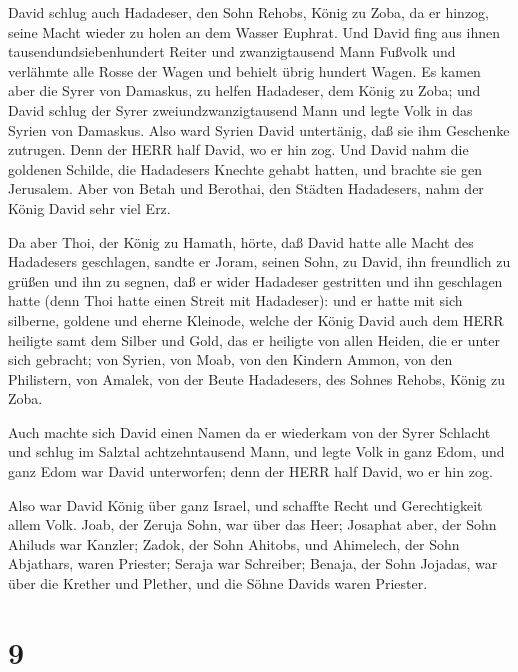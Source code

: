  David schlug auch Hadadeser, den Sohn Rehobs, König zu
Zoba, da er hinzog, seine Macht wieder zu holen an dem Wasser Euphrat.
 Und David fing aus ihnen tausendundsiebenhundert Reiter und
zwanzigtausend Mann Fußvolk und verlähmte alle Rosse der Wagen und
behielt übrig hundert Wagen.  Es kamen aber die Syrer von
Damaskus, zu helfen Hadadeser, dem König zu Zoba; und David schlug der
Syrer zweiundzwanzigtausend Mann  und legte Volk in das
Syrien von Damaskus. Also ward Syrien David untertänig, daß sie ihm
Geschenke zutrugen. Denn der HERR half David, wo er hin zog.
 Und David nahm die goldenen Schilde, die Hadadesers Knechte
gehabt hatten, und brachte sie gen Jerusalem.  Aber von
Betah und Berothai, den Städten Hadadesers, nahm der König David sehr
viel Erz.

 Da aber Thoi, der König zu Hamath, hörte, daß David hatte
alle Macht des Hadadesers geschlagen,  sandte er Joram,
seinen Sohn, zu David, ihn freundlich zu grüßen und ihn zu segnen, daß
er wider Hadadeser gestritten und ihn geschlagen hatte (denn Thoi hatte
einen Streit mit Hadadeser): und er hatte mit sich silberne, goldene und
eherne Kleinode,  welche der König David auch dem HERR
heiligte samt dem Silber und Gold, das er heiligte von allen Heiden, die
er unter sich gebracht;  von Syrien, von Moab, von den
Kindern Ammon, von den Philistern, von Amalek, von der Beute Hadadesers,
des Sohnes Rehobs, König zu Zoba.

 Auch machte sich David einen Namen da er wiederkam von der
Syrer Schlacht und schlug im Salztal achtzehntausend Mann, 
und legte Volk in ganz Edom, und ganz Edom war David unterworfen; denn
der HERR half David, wo er hin zog.

 Also war David König über ganz Israel, und schaffte Recht
und Gerechtigkeit allem Volk.  Joab, der Zeruja Sohn, war
über das Heer; Josaphat aber, der Sohn Ahiluds war Kanzler;
 Zadok, der Sohn Ahitobs, und Ahimelech, der Sohn
Abjathars, waren Priester; Seraja war Schreiber;  Benaja,
der Sohn Jojadas, war über die Krether und Plether, und die Söhne Davids
waren Priester.

\hypertarget{section-8}{%
\section{9}\label{section-8}}

